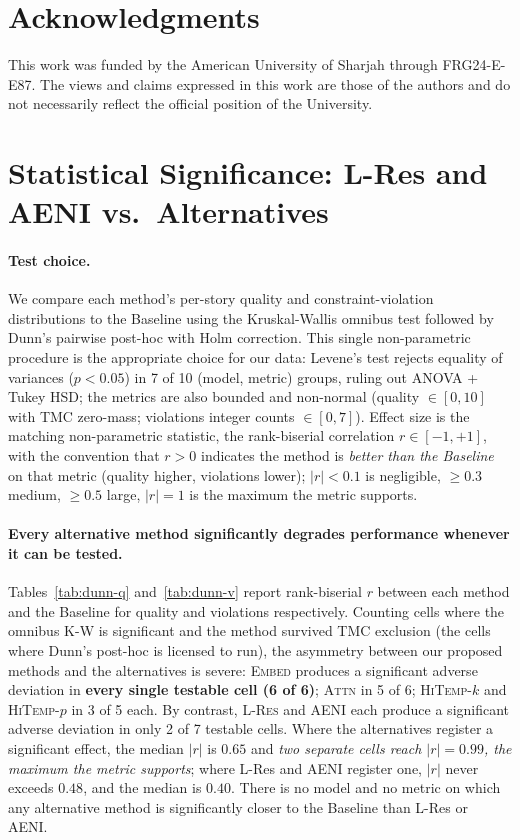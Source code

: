 \documentclass[11pt]{article}
\begin{document}
\section*{Acknowledgments}

This work was funded by the American University of Sharjah through FRG24-E-E87. The views and claims expressed in this work are those of the authors and do not necessarily reflect the official position of the University.



\newpage
\appendix
\section{Statistical Significance: L-Res and AENI vs.\ Alternatives}
\label{appendix:significance}
\paragraph{Test choice.}
We compare each method's per-story quality and constraint-violation distributions to the Baseline using the Kruskal-Wallis omnibus test followed by Dunn's pairwise post-hoc with Holm correction. This single non-parametric procedure is the appropriate choice for our data: Levene's test rejects equality of variances ($p < 0.05$) in 7 of 10 (model, metric) groups, ruling out ANOVA + Tukey HSD; the metrics are also bounded and non-normal (quality $\in [0,10]$ with TMC zero-mass; violations integer counts $\in [0,7]$). Effect size is the matching non-parametric statistic, the rank-biserial correlation $r \in [-1, +1]$, with the convention that $r > 0$ indicates the method is \emph{better than the Baseline} on that metric (quality higher, violations lower); $|r| < 0.1$ is negligible, $\geq 0.3$ medium, $\geq 0.5$ large, $|r| = 1$ is the maximum the metric supports.

\paragraph{Every alternative method significantly degrades performance whenever it can be tested.} Tables~\ref{tab:dunn-q} and~\ref{tab:dunn-v} report rank-biserial $r$ between each method and the Baseline for quality and violations respectively. Counting cells where the omnibus K-W is significant and the method survived TMC exclusion (the cells where Dunn's post-hoc is licensed to run), the asymmetry between our proposed methods and the alternatives is severe: \textsc{Embed} produces a significant adverse deviation in \textbf{every single testable cell (6 of 6)};
\textsc{Attn} in 5 of 6; \textsc{HiTemp-$k$} and \textsc{HiTemp-$p$} in 3 of 5 each. By contrast, \textsc{L-Res} and \textsc{AENI} each produce a
significant adverse deviation in only 2 of 7 testable cells. Where the alternatives register a significant effect, the median $|r|$ is $0.65$ and \emph{two separate cells reach $|r| = 0.99$, the maximum the metric supports}; where L-Res and AENI register one, $|r|$ never exceeds $0.48$, and the median is $0.40$. There is no model and no metric on which any alternative method is significantly closer to the Baseline than L-Res or AENI.
\end{document}
